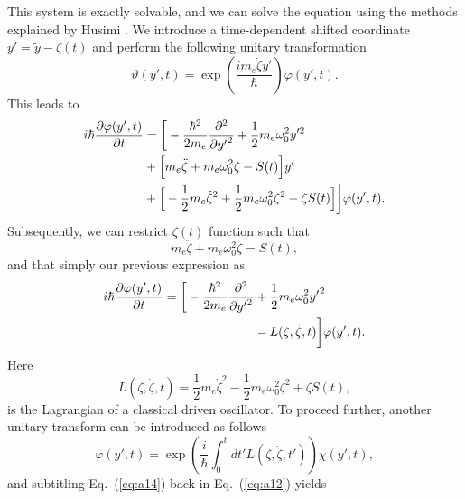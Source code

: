 This system is exactly solvable, and we can solve the equation using the methods explained by Husimi \cite{husimi53}. We introduce a time-dependent shifted coordinate $ y' = \tilde{y} - \zeta(t)$ and perform the following unitary transformation
\begin{equation} \label{eq:a9}
    \vartheta(y',t) = \exp(\frac{im_e\dot{\zeta}y'}{\hbar})\varphi(y',t).
\end{equation}
This leads to
\begin{equation} \label{eq:a10}
  \begin{aligned}
    i \hbar \pdv{\varphi(y',t)}{t}   &=
    \bigg[
        -  \frac{\hbar^2}{2m_e}\pdv[2]{{y'}}
        + \frac{1}{2} m_e \omega_0^2 y'^2 \\
        & +
        \Big[
            m_e\ddot{\zeta} + m_e\omega_0^2\zeta - S(t)
        \Big]y' \\
        &
        +
        \Big[
            - \frac{1}{2} m_e\dot{\zeta}^2 + \frac{1}{2}m_e\omega_0^2 \zeta^2 - \zeta S(t)
        \Big]
    \bigg]\varphi(y',t).
  \end{aligned}
\end{equation}
Subsequently, we can restrict $\zeta(t)$ function such that
\begin{equation} \label{eq:a11}
  m_e\ddot{\zeta} + m_e\omega_0^2\zeta = S(t),
\end{equation}
and that simply our previous expression as
\begin{equation} \label{eq:a12}
  \begin{aligned}
    i \hbar \pdv{\varphi(y',t)}{t}   =
    \bigg[
        -  \frac{\hbar^2}{2m_e}\pdv[2]{{y'}} &
        + \frac{1}{2} m_e \omega_0^2 {y'}^2 \\
        &
        - L(\zeta,\dot{\zeta},t)
    \bigg]\varphi(y',t).
  \end{aligned}
\end{equation}
Here
\begin{equation} \label{eq:a13}
  L(\zeta,\dot{\zeta},t) = \frac{1}{2} m_e\dot{\zeta}^2 - \frac{1}{2}m_e\omega_0^2 \zeta^2 + \zeta S(t),
\end{equation}
is the Lagrangian of a classical driven oscillator. To proceed further, another unitary transform can be introduced as follows
\begin{equation} \label{eq:a14}
    \varphi(y',t) = \exp(\frac{i}{\hbar}\int_0^{t}dt'L(\zeta,\dot{\zeta},t')) \chi(y',t),
\end{equation}
and subtitling Eq.~(\ref{eq:a14}) back in Eq.~(\ref{eq:a12}) yields

